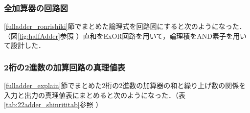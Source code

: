 %
%
\subsubsection{全加算器の回路図}
\label{fulladder_kairozu}
\ref{fulladder_ronrishiki}節でまとめた論理式を回路図にすると次のようになった．（図\ref{fig:halfAdder}参照 ）直和をExOR回路を用いて，論理積をAND素子を用いて設計した．

%
%
\subsubsection{2桁の2進数の加算回路の真理値表}
\label{22adder_shinriti}
\ref{fulladder_explain}節でまとめた2桁の2進数の加算器の和と繰り上げ数の関係を入力と出力の真理値表にまとめると次のようになった．（表\ref{tab:22adder_shinrititab}参照 ）

